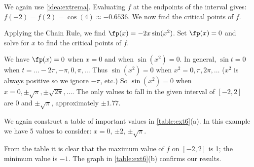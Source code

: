 
{We again use \autoref{idea:extrema}. Evaluating $f$ at the endpoints of the interval gives: $f(-2) = f(2) = \cos (4) \approx -0.6536.$ We now find the critical points of $f$.

Applying the Chain Rule, we find $\fp(x) = -2x\sin (x^2)$. Set $\fp(x) = 0$ and solve for $x$ to find the critical points of $f$. 

We have $\fp(x) = 0$ when $x = 0$ and when $\sin (x^2) = 0$. In general, $\sin t = 0$ when $t = \dotsc -2\pi, -\pi, 0, \pi, \dotsc$ Thus $\sin (x^2) = 0$ when $x^2 = 0, \pi, 2\pi, \dotsc$ ($x^2$ is always positive so we ignore $-\pi$, etc.) So $\sin (x^2)=0$ when $x=0, \pm\sqrt\pi, \pm\sqrt{2\pi}, \dotsc$. The only values to fall in the given interval of $[-2,2]$ are $0$ and $\pm\sqrt\pi$, approximately $\pm 1.77$.

We again construct a table of important values in \autoref{table:ext6}(a). In this example we have 5 values to consider: $x= 0$, $\pm 2$, $\pm\sqrt{\pi}$. 

From the table it is clear that the maximum value of $f$ on $[-2,2]$ is 1; the minimum value is $-1$. The graph in \autoref{table:ext6}(b) confirms our results.}

